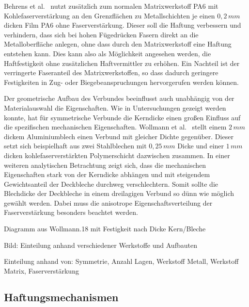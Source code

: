 Behrens et al.~\cite{BerndArno2019} nutzt zusätzlich zum normalen Matrixwerkstoff PA6 mit Kohlefaserverstärkung an den Grenzflächen zu Metallschichten je einen $0,2 \, mm$ dicken Film PA6 ohne Faserverstärkung.
Dieser soll die Haftung verbessern und verhindern, dass sich bei hohen Fügedrücken Fasern direkt an die Metalloberfläche anlegen, ohne dass durch den Matrixwerkstoff eine Haftung entstehen kann.
Dies kann also als Möglichkeit angesehen werden, die Haftfestigkeit ohne zusätzlichen Haftvermittler zu erhöhen.
Ein Nachteil ist der verringerte Faseranteil des Matrixwerkstoffen, so dass dadurch geringere Festigkeiten in Zug- oder Biegebeanspruchungen hervorgerufen werden können.


Der geometrische Aufbau des Verbundes beeinflusst auch unabhängig von der Materialauswahl die Eigenschaften.
Wie in Untersuchungen gezeigt werden konnte, hat für symmetrische Verbunde die Kerndicke einen großen Einfluss auf die spezifischen mechanischen Eigenschaften.
Wollmann et al.~\cite{Wollmann2018} stellt einem $2\,mm$ dickem Aluminiumblech einen Verbund mit gleicher Dichte gegenüber.
Dieser setzt sich beispielhaft aus zwei Stahlblechen mit $0,25\,mm$ Dicke und einer $1\,mm$ dicken kohlefaserverstärkten Polymerschicht dazwischen zusammen.
In einer weiteren analytischen Betrachtung zeigt sich, dass die mechanischen Eigenschaften stark von der Kerndicke abhängen und mit steigendem Gewichtsanteil der Deckbleche durchweg verschlechtern.
Somit sollte die Blechdicke der Deckbleche in einem dreilagigen Verbund so dünn wie möglich gewählt werden.
Dabei muss die anisotrope Eigenschaftsverteilung der Faserverstärkung besonders beachtet werden.

Diagramm aus Wollmann.18 mit Festigkeit nach Dicke Kern/Bleche


Bild: Einteilung anhand verschiedener Werkstoffe und Aufbauten


Einteilung anhand von: Symmetrie, Anzahl Lagen, Werkstoff Metall, Werkstoff Matrix, Faserverstärkung

\subsection{Haftungsmechanismen}\label{subsec:haftung}


